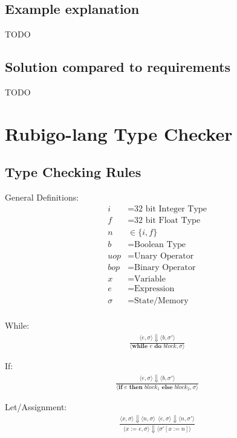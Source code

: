 \documentclass[12pt]{article}
\begin{document}
    \subsection{Example explanation}
    	TODO
    
    \subsection{Solution compared to requirements}
 	TODO





    \section{Rubigo-lang Type Checker}	
    	\subsection{Type Checking Rules}
	General Definitions:
    	\begin{align*}
		i &= \text{32 bit Integer Type} \\
		f &= \text{32 bit Float Type} \\
		n &\in \{i, f\} \\
		b &= \text{Boolean Type} \\
		uop &= \text{Unary Operator} \\
		bop &= \text{Binary Operator} \\
		x &= \text{Variable} \\
		e &= \text{Expression} \\
		\sigma &= \text{State/Memory} \\
	\end{align*}

	While:
	\begin{align*}
		\frac{\langle e, \sigma \rangle\Downarrow \langle b, \sigma' \rangle}
		{\langle \textbf{while } e \textbf{ do } block, \sigma \rangle}
	\end{align*}

	If:
	\begin{align*}
		\frac{\langle e, \sigma \rangle\Downarrow \langle b, \sigma' \rangle}
		{\langle \textbf{if } e \textbf{ then } block_1 \textbf{ else } block_2, \sigma \rangle}
	\end{align*}

	Let/Assignment:
	\begin{align*}
		\frac{
			\langle x, \sigma \rangle\Downarrow \langle n, \sigma \rangle \ \ 
			\langle e, \sigma \rangle\Downarrow \langle n, \sigma' \rangle
		}
		{\langle x := e, \sigma \rangle\Downarrow \langle \sigma' [x := n] \rangle}
	\end{align*}
\end{document}
